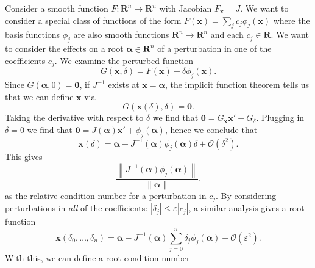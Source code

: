 \documentclass[3p, authoryear, square]{elsarticle}
\theoremstyle{definition}
\newcommand{\reals}{\mathbf{R}}
\newcommand{\bigO}[1]{\mathcal{O}\left(#1\right)}
\newcommand{\eps}{\varepsilon}
\begin{document}
Consider a smooth function \(F: \reals^n \longrightarrow \reals^n\)
with Jacobian \(F_{\bm{x}} = J\). We want to consider a special class of
functions of the form \(F\left(\bm{x}\right) = \sum_j c_j
\phi_j\left(\bm{x}\right)\) where the basis
functions \(\phi_j\) are also smooth functions
\(\reals^n \longrightarrow \reals^n\)
and each \(c_j \in \reals\). We want to consider the effects on a root
\(\bm{\alpha} \in \reals^n\) of a perturbation in one of the
coefficients \(c_j\). We examine the perturbed function
\begin{equation}
G\left(\bm{x}, \delta\right) = F\left(\bm{x}\right) +
\delta \phi_j\left(\bm{x}\right).
\end{equation}
Since \(G\left(\bm{\alpha}, 0\right) = \bm{0}\), if \(J^{-1}\) exists at
\(\bm{x} = \bm{\alpha}\),
the implicit function theorem tells us that we can define
\(\bm{x}\) via
\begin{equation}
G\left(\bm{x}\left(\delta\right), \delta\right) = \bm{0}.
\end{equation}
Taking the derivative with respect to \(\delta\) we find that
\(\bm{0} = G_{\bm{x}} \bm{x}' + G_{\delta}\). Plugging in
\(\delta = 0\) we find that \(\bm{0} = J\left(\bm{\alpha}\right) \bm{x}' +
\phi_j\left(\bm{\alpha}\right)\), hence we
conclude that
\begin{equation}
\bm{x}\left(\delta\right) = \bm{\alpha} - J^{-1}\left(\bm{\alpha}\right)
  \phi_j\left(\bm{\alpha}\right) \delta + \bigO{\delta^2}.
\end{equation}
This gives
\begin{equation}
\frac{\left \lVert J^{-1}\left(\bm{\alpha}\right)
  \phi_j\left(\bm{\alpha}\right) \right \rVert}{
  \left \lVert \bm{\alpha} \right \rVert}.
\end{equation}
as the relative condition number for a perturbation in \(c_j\).
By considering perturbations in \emph{all} of the coefficients:
\(\left|\delta_j\right| \leq \eps \left|c_j\right|\), a similar analysis
gives a root function
\begin{equation}
\bm{x}\left(\delta_0, \ldots, \delta_n\right) = \bm{\alpha} -
  J^{-1}\left(\bm{\alpha}\right) \sum_{j = 0}^n \delta_j
  \phi_j\left(\bm{\alpha}\right) + \bigO{\eps^2}.
\end{equation}
With this, we can define a root condition number
\end{document}
